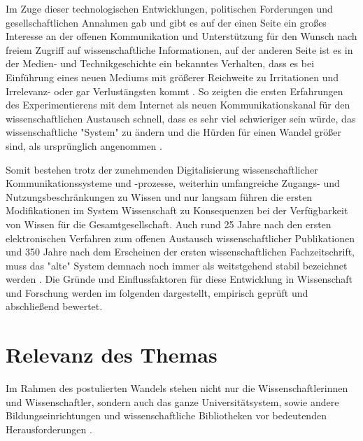 Im Zuge dieser technologischen Entwicklungen, politischen Forderungen und gesellschaftlichen Annahmen gab und gibt es auf der einen Seite ein großes Interesse an der offenen Kommunikation und Unterstützung für den Wunsch nach freiem Zugriff auf wissenschaftliche Informationen, auf der anderen Seite ist es in der Medien- und Technikgeschichte ein bekanntes Verhalten, dass es bei Einführung eines neuen Mediums mit größerer Reichweite zu Irritationen \cite{naeder_2010_open} und Irrelevanz- oder gar Verlustängsten kommt \cite{hagner_2015_sache_buches}. So zeigten die ersten Erfahrungen des Experimentierens mit dem Internet als neuen Kommunikationskanal für den wissenschaftlichen Austausch schnell, dass es sehr viel schwieriger sein würde, das wissenschaftliche "System" zu ändern und die Hürden für einen Wandel größer sind, als ursprünglich angenommen \cite{bjork_2004_open}.

Somit bestehen trotz der zunehmenden Digitalisierung wissenschaftlicher Kommunikationssysteme und -prozesse, weiterhin umfangreiche Zugangs- und Nutzungsbeschränkungen zu Wissen und nur langsam führen die ersten Modifikationen im System Wissenschaft zu Konsequenzen bei der Verfügbarkeit von Wissen für die Gesamtgesellschaft. Auch rund 25 Jahre nach den ersten elektronischen Verfahren zum offenen Austausch wissenschaftlicher Publikationen und 350 Jahre nach dem Erscheinen der ersten wissenschaftlichen Fachzeitschrift, muss das "alte" System demnach noch immer als weitstgehend stabil bezeichnet werden \cite{brembs2015open} \cite{Hanekop_2014}. Die Gründe und Einflussfaktoren für diese Entwicklung in Wissenschaft und Forschung werden im folgenden dargestellt, empirisch geprüft und abschließend bewertet.

\section{Relevanz des Themas}

Im Rahmen des postulierten Wandels stehen nicht nur die Wissenschaftlerinnen und Wissenschaftler, sondern auch das ganze Universitätsystem, sowie andere Bildungseinrichtungen und wissenschaftliche Bibliotheken vor bedeutenden Herausforderungen \cite{muller_2010_open} \cite{Harter2006} \cite{Gu_don_2004} \cite{osterloh2008anreize} \cite{Beverungen_2014}.

